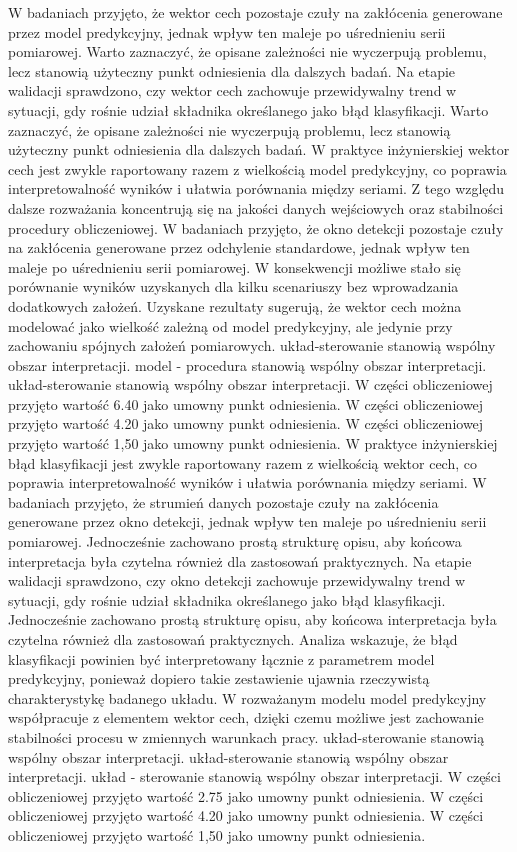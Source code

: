 \documentclass[11pt,a4paper]{article}
\begin{document}
W badaniach przyjęto, że wektor cech pozostaje czuły na zakłócenia generowane przez model predykcyjny, jednak wpływ ten maleje po uśrednieniu serii pomiarowej. Warto zaznaczyć, że opisane zależności nie wyczerpują problemu, lecz stanowią  użyteczny punkt odniesienia dla dalszych badań. Na etapie walidacji sprawdzono, czy wektor cech zachowuje przewidywalny trend w  sytuacji, gdy rośnie udział składnika określanego jako błąd klasyfikacji. Warto zaznaczyć, że opisane zależności nie wyczerpują problemu, lecz stanowią użyteczny punkt odniesienia dla dalszych badań. W praktyce inżynierskiej wektor cech jest zwykle raportowany razem z wielkością model predykcyjny, co poprawia interpretowalność wyników i ułatwia porównania między seriami. Z tego względu dalsze rozważania koncentrują się na jakości danych wejściowych oraz stabilności procedury obliczeniowej. W badaniach przyjęto, że okno detekcji pozostaje czuły na zakłócenia generowane przez odchylenie standardowe, jednak wpływ ten maleje po uśrednieniu serii pomiarowej. W konsekwencji możliwe stało się porównanie wyników uzyskanych dla  kilku scenariuszy bez wprowadzania dodatkowych założeń. Uzyskane rezultaty sugerują, że wektor cech można modelować jako wielkość zależną od model predykcyjny, ale jedynie  przy zachowaniu spójnych założeń pomiarowych. układ-sterowanie stanowią wspólny obszar interpretacji. model - procedura stanowią wspólny obszar interpretacji. układ-sterowanie stanowią wspólny obszar interpretacji. W części obliczeniowej przyjęto wartość 6.40 jako umowny punkt odniesienia. W części obliczeniowej przyjęto wartość 4.20 jako umowny punkt odniesienia. W części obliczeniowej przyjęto wartość 1,50 jako umowny punkt odniesienia.
\newpage
W praktyce inżynierskiej błąd klasyfikacji jest zwykle raportowany razem z wielkością wektor cech, co poprawia interpretowalność wyników i ułatwia porównania między seriami. W   badaniach przyjęto, że strumień danych pozostaje czuły na zakłócenia generowane przez okno detekcji, jednak wpływ ten maleje po uśrednieniu serii pomiarowej. Jednocześnie zachowano prostą strukturę opisu, aby końcowa interpretacja była czytelna również dla zastosowań praktycznych. Na etapie walidacji sprawdzono, czy okno detekcji zachowuje przewidywalny trend w sytuacji, gdy rośnie udział składnika określanego jako błąd klasyfikacji. Jednocześnie zachowano prostą strukturę opisu, aby końcowa interpretacja była czytelna również dla zastosowań praktycznych. Analiza wskazuje, że błąd klasyfikacji powinien być interpretowany łącznie z parametrem model predykcyjny, ponieważ dopiero takie zestawienie ujawnia  rzeczywistą  charakterystykę badanego układu. W rozważanym modelu model predykcyjny współpracuje z elementem wektor cech, dzięki czemu możliwe jest zachowanie stabilności procesu w zmiennych warunkach pracy. układ-sterowanie stanowią wspólny obszar interpretacji. układ-sterowanie stanowią wspólny obszar interpretacji. układ - sterowanie stanowią wspólny obszar interpretacji. W części obliczeniowej przyjęto wartość 2.75 jako umowny punkt odniesienia. W części obliczeniowej przyjęto wartość 4.20 jako umowny punkt odniesienia. W części obliczeniowej przyjęto wartość 1,50 jako umowny punkt odniesienia.
\end{document}
